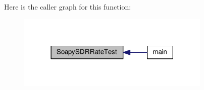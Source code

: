 Here is the caller graph for this function\+:
\nopagebreak
\begin{figure}[H]
\begin{center}
\leavevmode
\includegraphics[width=261pt]{d3/dca/SoapySDRUtil_8cpp_a5116f4b7c259265f891e56760ba4a337_icgraph}
\end{center}
\end{figure}


